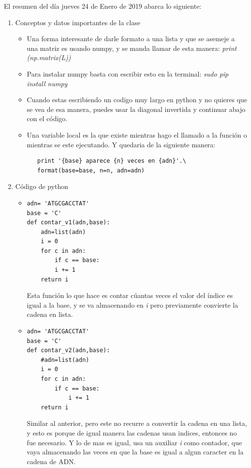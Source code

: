 \documentclass[letterpaper, 12pt,oneside]{article}
\begin{document}
	El resumen del día jueves 24 de Enero de 2019 abarca lo siguiente:
	\begin{enumerate}
		\item Conceptos y datos importantes de la clase
			\begin{itemize}
				\item Una forma interesante de darle formato a una lista y que se asemeje a una matriz es usando numpy, y se manda llamar de esta manera: \textit{print (np.matrix(L))}\\
				

				\item Para instalar numpy basta con escribir esto en la terminal: \textit{sudo pip install numpy}\\
				
				\item Cuando estas escribiendo un codigo muy largo en python y no quieres que se vea de esa manera, puedes usar la diagonal invertida y continuar abajo con el código.\\
				
				\item Una variable local es la que existe mientras hago el llamado a la función o mientras se este ejecutando. Y quedaria de la siguiente manera:  \begin{lstlisting}
   print '{base} aparece {n} veces en {adn}'.\
   format(base=base, n=n, adn=adn)
				\end{lstlisting}
				
				
				
			\end{itemize}
		
		
		
		\item Código de python
			\begin{itemize}
				\item \begin{lstlisting}
adn= 'ATGCGACCTAT'
base = 'C'				
def contar_v1(adn,base):
    adn=list(adn)
    i = 0
    for c in adn:
        if c == base:
        i += 1
    return i
				\end{lstlisting} Esta función lo que hace es contar cúantas veces el valor del índice es igual a la base, y se va almacenando en \textit{i} pero previamente convierte la cadena en lista.\\
				
				
				\item \begin{lstlisting}
adn= 'ATGCGACCTAT'
base = 'C'
def contar_v2(adn,base):
    #adn=list(adn)
    i = 0
    for c in adn:
        if c == base:
            i += 1
    return i
				\end{lstlisting} Similar al anterior, pero este no recurre a convertir la cadena en una lista, y esto es porque de igual manera las cadenas usan indices, entonces no fue necesario. Y lo de mas es igual, usa un auxiliar \textit{i} como contador, que vaya almacenando las veces en que la base es igual a algun caracter en la cadena de ADN.\\
				

\end{itemize}
\end{enumerate}
\end{document}

